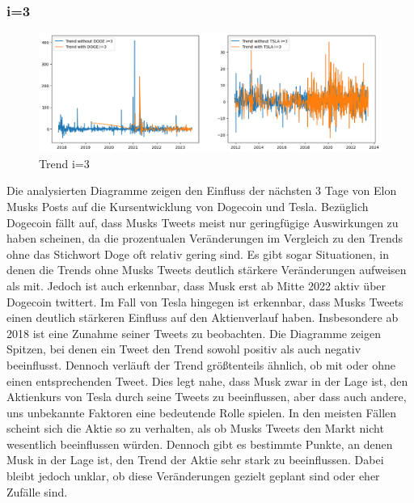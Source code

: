 \documentclass{article}
\begin{document}
\subsubsection{i=3} \label{i=3}
\begin{figure}[!htb]
  	\includegraphics[width=\textwidth, center]{../imgs/Trendi3.png}
 	\caption{Trend i=3}
 	\label{fig:Trendi3}
\end{figure}
Die analysierten Diagramme zeigen den Einfluss der nächsten 3 Tage von Elon Musks Posts auf die Kursentwicklung von Dogecoin und Tesla.
Bezüglich Dogecoin fällt auf, dass Musks Tweets meist nur geringfügige Auswirkungen zu haben scheinen, da die prozentualen Veränderungen im Vergleich zu den Trends ohne das Stichwort Doge oft relativ gering sind.
Es gibt sogar Situationen, in denen die Trends ohne Musks Tweets deutlich stärkere Veränderungen aufweisen als mit.
Jedoch ist auch erkennbar, dass Musk erst ab Mitte 2022 aktiv über Dogecoin twittert.
Im Fall von Tesla hingegen ist erkennbar, dass Musks Tweets einen deutlich stärkeren Einfluss auf den Aktienverlauf haben.
Insbesondere ab 2018 ist eine Zunahme seiner Tweets zu beobachten.
Die Diagramme zeigen Spitzen, bei denen ein Tweet den Trend sowohl positiv als auch negativ beeinflusst.
Dennoch verläuft der Trend größtenteils ähnlich, ob mit oder ohne einen entsprechenden Tweet.
Dies legt nahe, dass Musk zwar in der Lage ist, den Aktienkurs von Tesla durch seine Tweets zu beeinflussen, aber dass auch andere, uns unbekannte Faktoren eine bedeutende Rolle spielen.
In den meisten Fällen scheint sich die Aktie so zu verhalten, als ob Musks Tweets den Markt nicht wesentlich beeinflussen würden.
Dennoch gibt es bestimmte Punkte, an denen Musk in der Lage ist, den Trend der Aktie sehr stark zu beeinflussen.
Dabei bleibt jedoch unklar, ob diese Veränderungen gezielt geplant sind oder eher Zufälle sind.
\end{document}
